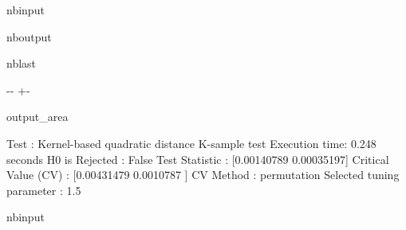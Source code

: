 \documentclass[letterpaper,10pt,english,openany,oneside]{sphinxmanual}
\begin{document}
\begin{sphinxuseclass}{nbinput}
\end{sphinxuseclass}
\begin{sphinxuseclass}{nboutput}
\begin{sphinxuseclass}{nblast}
{

\kern-\sphinxverbatimsmallskipamount\kern-\baselineskip
\kern+\FrameHeightAdjust\kern-\fboxrule
\vspace{\nbsphinxcodecellspacing}

\begin{sphinxuseclass}{output_area}
\begin{sphinxuseclass}{}


\begin{sphinxVerbatim}[commandchars=\\\{\}]
Test : Kernel-based quadratic distance K-sample test
Execution time: 0.248 seconds
H0 is Rejected : False
Test Statistic : [0.00140789 0.00035197]
Critical Value (CV) : [0.00431479 0.0010787 ]
CV Method : permutation
Selected tuning parameter : 1.5
\end{sphinxVerbatim}



\end{sphinxuseclass}
\end{sphinxuseclass}
}

\end{sphinxuseclass}
\end{sphinxuseclass}
\begin{sphinxuseclass}{nbinput}
{
\begin{sphinxVerbatim}[commandchars=\\\{\}]
\llap{\color{nbsphinxin}[9]:\,\hspace{\fboxrule}\hspace{\fboxsep}}
\end{sphinxVerbatim}
}

\end{sphinxuseclass}
\end{document}
